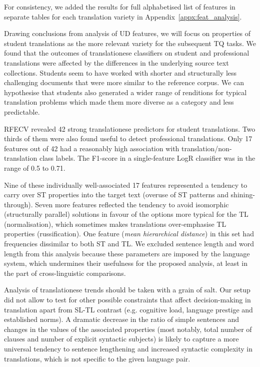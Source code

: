 For consistency, we added the results for full alphabetised list of features in separate tables for each translation variety in Appendix~\ref{appx:feat_analysis}.  

Drawing conclusions from analysis of UD features, we will focus on properties of student translations as the more relevant variety for the subsequent TQ tasks. We found that the outcomes of translationese classifiers on student and professional translations were affected by the differences in the underlying source text collections. Students seem to have worked with shorter and structurally less challenging documents that were more similar to the reference corpus. 
We can hypothesise that students also generated a wider range of renditions for typical translation problems which made them more diverse as a category and less predictable.

RFECV revealed 42 strong translationese predictors for student translations. Two thirds of them were also found useful to detect professional translations. Only 17 features out of 42 had a reasonably high association with translation/non-translation class labels. The F1-score in a single-feature LogR classifier was in the range of 0.5 to 0.71. 

Nine of these individually well-associated 17 features represented a tendency to carry over ST properties into the target text (overuse of ST patterns and shining-through). Seven more features reflected the tendency to avoid isomorphic (structurally parallel) solutions in favour of the options more typical for the TL (normalisation), which sometimes makes translations over-emphasise TL properties (russification). One feature (\textit{mean hierarchical distance}) in this set had frequencies dissimilar to both ST and TL.
We excluded sentence length and word length from this analysis because these parameters are imposed by the language system, which undermines their usefulness for the proposed analysis, at least in the part of cross-linguistic comparisons.

Analysis of translationese trends should be taken with a grain of salt. Our setup did not allow to test for other possible constraints that affect decision-making in translation apart from SL-TL contrast (e.g. cognitive load, language prestige and established norms). A dramatic decrease in the ratio of simple sentences and changes in the values of the associated properties (most notably, total number of clauses and number of explicit syntactic subjects) is likely to capture a more universal tendency to sentence lengthening and increased syntactic complexity in translations, which is not specific to the given language pair. 

